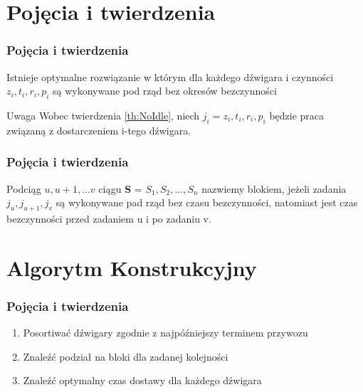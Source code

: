 \documentclass{beamer}
\begin{document}


\section{Pojęcia i twierdzenia}

\begin{frame}

\frametitle{Pojęcia i twierdzenia}
  
 \begin{theorem}\label{th:NoIdle}
  Istnieje optymalne rozwiązanie w którym dla każdego dźwigara i czynności $z_i, t_i, r_i, p_i$ są wykonywane
  pod rząd bez okresów bezczynności
 \end{theorem}
 
 \begin{block}{Uwaga}
  Wobec twierdzenia \ref{th:NoIdle}, niech $j_i = z_i, t_i, r_i, p_i$ będzie praca związaną z dostarczeniem i-tego dźwigara.
 \end{block}

\end{frame}
 



\begin{frame}
\frametitle{Pojęcia i twierdzenia}
  
 \begin{definition}\label{de:block}
  Podciąg $ u, u+1, ... v$ ciągu \textbf{S} = $S_1, S_2,...,S_n $ nazwiemy \alert{blokiem}, jeżeli zadania $j_u, j_{u+1}, j_v $
  są wykonywane pad rząd bez czasu bezczynności, natomiast jest czas bezczynności przed zadaniem u i po zadaniu v.
 \end{definition}
 
 
\end{frame}




\section{Algorytm Konstrukcyjny}

\begin{frame}

\frametitle{Pojęcia i twierdzenia}

\begin{enumerate}
 \item Posortiwać dźwigary zgodnie z najpóźniejszy terminem przywozu
 \item Znaleźć podział na bloki dla zadanej kolejności
 \item Znaleźć optymalny czas dostawy dla każdego dźwigara
\end{enumerate}

\end{frame}
\end{document}
